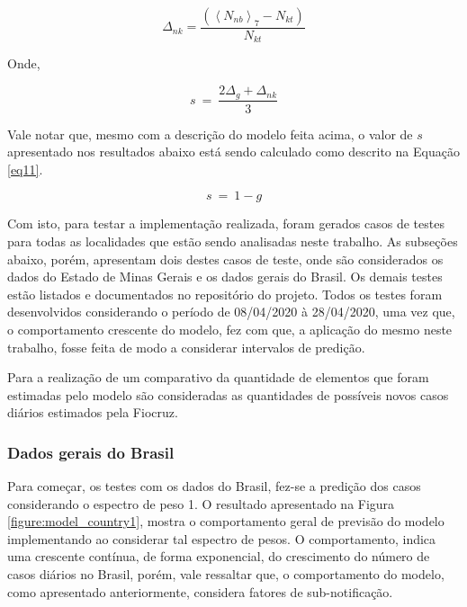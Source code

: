 \documentclass[a4paper,12pt]{article}
\begin{document}
\begin{equation}
\Delta _{nk}=\frac{\left(\left\langle N_{nb}\right\rangle _7-N_{kt}\right)}{N_{kt}}
\label{eq10}
\end{equation}

\par Onde,

\begin{equation}
s\:=\:\frac{2\Delta _g+\Delta _{nk}}{3}
\label{eq10}
\end{equation}

\par Vale notar que, mesmo com a descrição do modelo feita acima, o valor de $s$ apresentado nos resultados abaixo está sendo calculado como descrito na Equação \ref{eq11}.

\begin{equation}
s\:=\:1-g
\label{eq11}
\end{equation}

\par Com isto, para testar a implementação realizada, foram gerados casos de testes para todas as localidades que estão sendo analisadas neste trabalho. As subseções abaixo, porém, apresentam dois destes casos de teste, onde são considerados os dados do Estado de Minas Gerais e os dados gerais do Brasil. Os demais testes estão listados e documentados no repositório do projeto. Todos os testes foram desenvolvidos considerando o período de 08/04/2020 à 28/04/2020, uma vez que, o comportamento crescente do modelo, fez com que, a aplicação do mesmo neste trabalho, fosse feita de modo a considerar intervalos de predição.

\par Para a realização de um comparativo da quantidade de elementos que foram estimadas pelo modelo são consideradas as quantidades de possíveis novos casos diários estimados pela Fiocruz.

\subsubsection{Dados gerais do Brasil}
\label{sssectionBrasil}

\par Para começar, os testes com os dados do Brasil, fez-se a predição dos casos considerando o espectro de peso 1. O resultado apresentado na Figura \ref{figure:model_country1}, mostra o comportamento geral de previsão do modelo implementando ao considerar tal espectro de pesos. O comportamento, indica uma crescente contínua, de forma exponencial, do crescimento do número de casos diários no Brasil, porém, vale ressaltar que, o comportamento do modelo, como apresentado anteriormente, considera fatores de sub-notificação.
\end{document}
